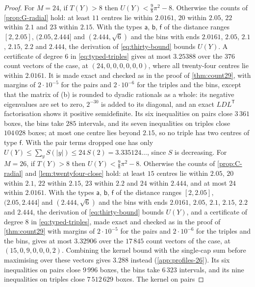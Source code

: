 \documentclass[11pt,reqno]{amsart}
\renewcommand{\_}{\origunderscore\allowbreak}
\numberwithin{equation}{section}
\theoremstyle{plain}
\theoremstyle{definition}
\theoremstyle{remark}
\begin{document}
\begin{proof}
For $M=24$, if $T(Y)>8$ then $U(Y)<\frac98\pi^2-8$. Otherwise the counts of
\cref{prop:G-radial} hold: at least $11$ centres lie within $2.0161$, $20$
within $2.05$, $22$ within $2.1$ and $23$ within $2.15$. With the types
$\mathsf a$, $\mathsf b$, $\mathsf f$ of the distance ranges $[2,2.05]$,
$(2.05,2.444]$ and $(2.444,\sqrt6)$ and the bins with ends $2.0161$, $2.05$,
$2.1$, $2.15$, $2.2$ and $2.444$, the derivation of \eqref{eq:thirty-bound}
bounds $U(Y)$. A certificate of degree $6$ in \eqref{eq:typed-triples}
gives at most $3.25388$ over the $376$ count vectors of the case, at
$(24,0,0,0,0,0,0)$, where all twenty-four centres lie within $2.0161$. It is
made exact and checked as in the proof of \cref{thm:count29}, with margins
of $2\cdot10^{-5}$ for the pairs and $2\cdot10^{-6}$ for the triples and
the bins, except that the matrix of (b) is rounded to dyadic rationals as a
whole: its negative eigenvalues are set to zero, $2^{-30}$ is added to its
diagonal, and an exact $LDL^{\mathsf T}$ factorisation shows it positive
semidefinite. Its six inequalities on pairs close $3\,361$ boxes, the bins take $285$
intervals, and its seven inequalities on triples close $104\,028$ boxes;
at most one centre lies beyond $2.15$, so no triple has two centres of type
$\mathsf f$. With the pair terms dropped one has only
$U(Y)\le\sum_yS(|y|)\le24\,S(2)=3.335124\ldots$, since $S$ is decreasing.
For $M=26$, if
$T(Y)>8$ then $U(Y)<\frac98\pi^2-8$. Otherwise the counts of
\cref{prop:C-radial} and \cref{lem:twentyfour-close} hold: at least $15$
centres lie within $2.05$, $20$ within $2.1$, $22$ within $2.15$, $23$
within $2.2$ and $24$ within $2.444$, and at most $24$ within $2.0161$. With
the types $\mathsf a$, $\mathsf b$, $\mathsf f$ of the distance ranges
$[2,2.05]$, $(2.05,2.444]$ and $(2.444,\sqrt6)$ and the bins with ends
$2.0161$, $2.05$, $2.1$, $2.15$, $2.2$ and $2.444$, the derivation of
\eqref{eq:thirty-bound} bounds $U(Y)$, and a certificate of degree $8$ in
\eqref{eq:typed-triples}, made exact and checked as in the proof of
\cref{thm:count29} with margins of $2\cdot10^{-5}$ for the pairs and
$2\cdot10^{-6}$ for the triples and the bins, gives at most $3.32906$ over the
$17\,845$ count vectors of the case, at $(15,0,9,0,0,0,2)$. Combining the
kernel bound with the single-cap sum before maximising over these vectors
gives $3.288$ instead (\cref{app:profiles-26}). Its six inequalities on
pairs close $9\,996$ boxes, the bins take $6\,323$ intervals, and
its nine inequalities on triples close $7\,512\,629$ boxes. The kernel on pairs

\end{proof}
\end{document}
